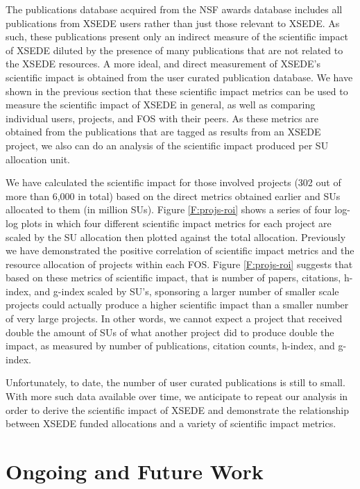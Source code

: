 \documentclass{sig-alternate}
\begin{document}
The publications database acquired from the NSF awards database includes all publications from XSEDE users rather than just those relevant to XSEDE. As such, these publications present only an indirect measure of the scientific impact of XSEDE diluted by the presence of many publications that are not related to the XSEDE resources. A more ideal, and direct measurement of XSEDE's scientific impact is obtained from the user curated publication database. We have shown in the previous section that these scientific impact metrics can be used to measure the scientific impact of XSEDE in general, as well as comparing individual users, projects, and FOS with their peers. As these metrics are obtained from the publications that are tagged as results from an XSEDE project, we also can do an analysis of the scientific impact produced per SU allocation unit.

We have calculated the scientific impact for those involved projects (302 out of more than 6,000 in total) based on the direct metrics obtained earlier and SUs allocated to them (in million SUs). Figure \ref{F:projs-roi} shows a series of four log-log plots in which four different scientific impact metrics for each project are scaled by the SU allocation then plotted against the total allocation. Previously we have demonstrated the positive correlation of scientific impact metrics and the resource allocation of projects within each FOS. Figure \ref{F:projs-roi} suggests that based on these metrics of scientific impact, that is number of papers, citations, h-index, and g-index scaled by SU's, sponsoring a larger number of smaller scale projects could actually produce a higher scientific impact than a smaller number of very large projects. In other words, we cannot expect a project that received double the amount of SUs of what another project did to produce double the impact, as measured by number of publications, citation counts, h-index, and g-index.

Unfortunately, to date, the number of user curated publications is still to small. With more such data available over time, we anticipate to repeat our analysis in order to derive the scientific impact of XSEDE and demonstrate the relationship between XSEDE funded allocations and a variety of scientific impact metrics.

\section{Ongoing and Future Work} \label{S:futurework}
\end{document}

